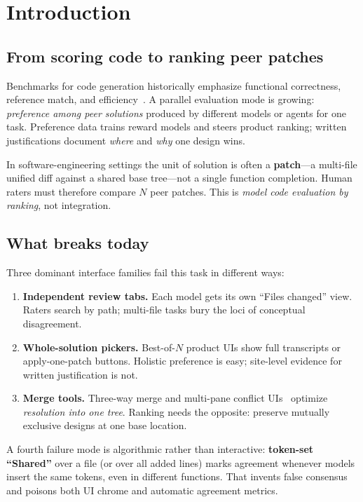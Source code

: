 \documentclass[
  11pt,
  a4paper,
  oneside,
  numbers=noenddot,
  abstract=true,
  headings=normal,
  DIV=11,
  BCOR=0mm,
]{scrartcl}
\theoremstyle{definition}
\theoremstyle{plain}
\theoremstyle{remark}
\begin{document}
\section{Introduction}
\label{sec:intro}

\subsection{From scoring code to ranking peer patches}

Benchmarks for code generation historically emphasize functional
correctness, reference match, and efficiency~\cite{zheng2024survey,effibench}.
A parallel evaluation mode is growing: \emph{preference among peer
solutions} produced by different models or agents for one task. Preference
data trains reward models and steers product ranking; written
justifications document \emph{where} and \emph{why} one design wins.

In software-engineering settings the unit of solution is often a
\textbf{patch}---a multi-file unified diff against a shared base tree---not
a single function completion. Human raters must therefore compare $N$ peer
patches. This is \emph{model code evaluation by ranking}, not integration.

\subsection{What breaks today}

Three dominant interface families fail this task in different ways:

\begin{enumerate}
  \item \textbf{Independent review tabs.} Each model gets its own ``Files
        changed'' view. Raters search by path; multi-file tasks bury the
        loci of conceptual disagreement.
  \item \textbf{Whole-solution pickers.} Best-of-$N$ product UIs show full
        transcripts or apply-one-patch buttons. Holistic preference is
        easy; site-level evidence for written justification is not.
  \item \textbf{Merge tools.} Three-way merge and multi-pane conflict
        UIs~\cite{mens2002survey,khanna2007unified} optimize
        \emph{resolution into one tree}. Ranking needs the opposite:
        preserve mutually exclusive designs at one base location.
\end{enumerate}

A fourth failure mode is algorithmic rather than interactive:
\textbf{token-set ``Shared''} over a file (or over all added lines) marks
agreement whenever models insert the same tokens, even in different
functions. That invents false consensus and poisons both UI chrome and
automatic agreement metrics.
\end{document}
